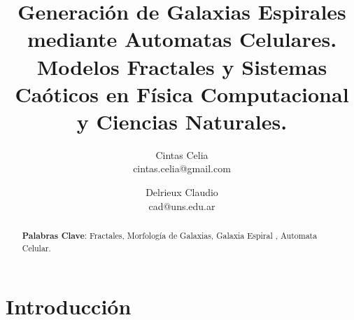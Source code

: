 \documentclass[12tp]{article}
\begin{document}
\pagestyle{empty} %

  \title{\bf {Generación de Galaxias Espirales mediante Automatas Celulares.}\\
  \small{Modelos Fractales y Sistemas Caóticos en Física Computacional y Ciencias Naturales.}} 
  \author{
    \small{Cintas Celia}\\
    \small{cintas.celia@gmail.com}
  \and
    \small{Delrieux Claudio}\\
    \small{cad@uns.edu.ar}
}

\maketitle

\begin{abstract}


\textbf{Palabras Clave}: Fractales, Morfología de Galaxias, Galaxia Espiral , Automata Celular.\\
\end{abstract}

\section{Introducción}
\end{document}
